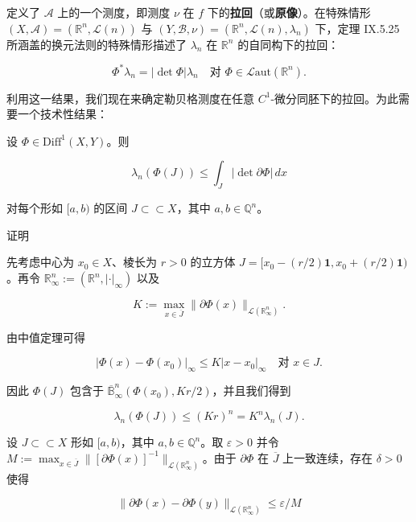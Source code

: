 定义了 $ \mathcal{A} $ 上的一个测度，即测度 $ \nu $ 在 $ f $ 下的\textbf{拉回}（或\textbf{原像}）。在特殊情形 $ (X, \mathcal{A}) = (\mathbb{R}^{n}, \mathcal{L}(n)) $ 与 $ (Y, \mathcal{B}, \nu) = (\mathbb{R}^{n}, \mathcal{L}(n), \lambda_{n}) $ 下，定理 IX.5.25 所涵盖的换元法则的特殊情形描述了 $ \lambda_{n} $ 在 $ \mathbb{R}^{n} $ 的自同构下的拉回：

\[
\Phi^{*}\lambda_{n} = |\det \Phi| \lambda_{n} \quad \text{对 } \Phi \in \mathcal{L}\mathrm{aut}(\mathbb{R}^{n}) .
\]

利用这一结果，我们现在来确定勒贝格测度在任意 $ C^{1} $-微分同胚下的拉回。为此需要一个技术性结果：

\begin{lemma}

设 $ \Phi \in \mathrm{Diff}^{1}(X, Y) $。则

\[
\lambda_{n}(\Phi(J)) \le \int_{J} |\det \partial\Phi| \, dx
\]

对每个形如 $ [a, b) $ 的区间 $ J \subset\subset X $，其中 $ a, b \in \mathbb{Q}^{n} $。

证明

\begin{subitems}
\item

先考虑中心为 $ x_{0} \in X $、棱长为 $ r > 0 $ 的立方体 $ J = [x_{0} - (r/2)\mathbf{1}, x_{0} + (r/2)\mathbf{1}) $。再令 $ \mathbb{R}^{n}_{\infty} := (\mathbb{R}^{n}, |\cdot|_{\infty}) $ 以及

\[
K := \max_{x\in \overline{J}} \|\partial\Phi(x)\|_{\mathcal{L}(\mathbb{R}^{n}_{\infty})} .
\]

由中值定理可得

\[
|\Phi(x) - \Phi(x_{0})|_{\infty} \le K |x - x_{0}|_{\infty} \quad \text{对 } x \in J .
\]

因此 $ \Phi(J) $ 包含于 $ \overline{\mathbb{B}}^{n}_{\infty}(\Phi(x_{0}), Kr/2) $，并且我们得到

\begin{equation}
\lambda_{n}(\Phi(J)) \le (Kr)^{n} = K^{n}\lambda_{n}(J) .\tag{8.1}
\end{equation}
\item

设 $ J \subset\subset X $ 形如 $ [a, b) $，其中 $ a, b \in \mathbb{Q}^{n} $。取 $ \varepsilon > 0 $ 并令 $ M := \max_{x\in \overline{J}} \|[\partial\Phi(x)]^{-1}\|_{\mathcal{L}(\mathbb{R}^{n}_{\infty})} $。由于 $ \partial\Phi $ 在 $ \overline{J} $ 上一致连续，存在 $ \delta > 0 $ 使得

\begin{equation}
\|\partial\Phi(x) - \partial\Phi(y)\|_{\mathcal{L}(\mathbb{R}^{n}_{\infty})} \le \varepsilon/M\tag{8.2}
\end{equation}


\end{subitems}
\end{lemma}
